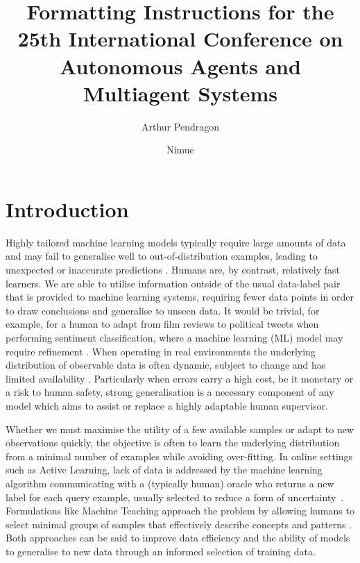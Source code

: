 \documentclass[sigconf,anonymous]{aamas}
\title[AAMAS-2026 Formatting Instructions]{Formatting Instructions for the 25th International Conference on Autonomous Agents and Multiagent Systems}
\author{Arthur Pendragon}
\affiliation{
  \institution{Camelot Castle}
  \city{Camelot}
  \country{United Kingdom}}
\author{Nimue}
\affiliation{
  \institution{The Lady's Lake}
  \city{Avalon}
  \country{United Kingdom}}
\begin{document}

\pagestyle{fancy}
\fancyhead{}


\maketitle 




\section{Introduction}
Highly tailored machine learning models typically require large amounts of data and may fail to generalise well to out-of-distribution examples, leading to unexpected or inaccurate predictions \cite{hand_classifier, Challen231, souza2020challenges}. Humans are, by contrast, relatively fast learners. We are able to utilise information outside of the usual data-label pair that is provided to machine learning systems, requiring fewer data points in order to draw conclusions and generalise to unseen data. It would be trivial, for example, for a human to adapt from film reviews to political tweets when performing sentiment classification, where a machine learning (ML) model may require refinement \cite{blitzer-etal-2007-biographies}. When operating in real environments the underlying distribution of observable data is often dynamic, subject to change and has limited availability \cite{Sahiner2023}. Particularly when errors carry a high cost, be it monetary or a risk to human safety, strong generalisation is a necessary component of any model which aims to assist or replace a highly adaptable human supervisor.

Whether we must maximise the utility of a few available samples or adapt to new observations quickly, the objective is often to learn the underlying distribution from a minimal number of examples while avoiding over-fitting. In online settings such as Active Learning, lack of data is addressed by the machine learning algorithm communicating with a (typically human) oracle who returns a new label for each query example, usually selected to reduce a form of uncertainty~\cite{prince2004does}. Formulations like Machine Teaching approach the problem by allowing humans to select minimal groups of samples that effectively describe concepts and patterns \cite{Zhu2015}. Both approaches can be said to improve data efficiency and the ability of models to generalise to new data through an informed selection of training data.
\end{document}
